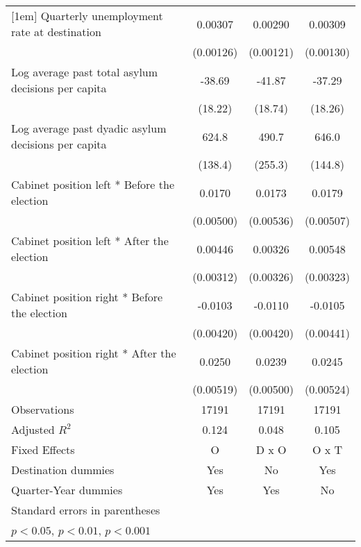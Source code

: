 \begin{table}[htbp]
\begin{tabular}{l*{3}{c}}
[1em]
Quarterly unemployment rate at destination&     0.00307\sym{*}  &     0.00290\sym{*}  &     0.00309\sym{*}  \\
                    &   (0.00126)         &   (0.00121)         &   (0.00130)         \\
[1em]
Log average past total asylum decisions per capita&      -38.69\sym{*}  &      -41.87\sym{*}  &      -37.29\sym{*}  \\
                    &     (18.22)         &     (18.74)         &     (18.26)         \\
[1em]
Log average past dyadic asylum decisions per capita&       624.8\sym{***}&       490.7         &       646.0\sym{***}\\
                    &     (138.4)         &     (255.3)         &     (144.8)         \\
[1em]
Cabinet position left * Before the election&      0.0170\sym{**} &      0.0173\sym{**} &      0.0179\sym{***}\\
                    &   (0.00500)         &   (0.00536)         &   (0.00507)         \\
[1em]
Cabinet position left * After the election&     0.00446         &     0.00326         &     0.00548         \\
                    &   (0.00312)         &   (0.00326)         &   (0.00323)         \\
[1em]
Cabinet position right * Before the election&     -0.0103\sym{*}  &     -0.0110\sym{*}  &     -0.0105\sym{*}  \\
                    &   (0.00420)         &   (0.00420)         &   (0.00441)         \\
[1em]
Cabinet position right * After the election&      0.0250\sym{***}&      0.0239\sym{***}&      0.0245\sym{***}\\
                    &   (0.00519)         &   (0.00500)         &   (0.00524)         \\
\hline
Observations        &       17191         &       17191         &       17191         \\
Adjusted \(R^{2}\)  &       0.124         &       0.048         &       0.105         \\
Fixed Effects       &           O         &       D x O         &       O x T         \\
Destination dummies &         Yes         &          No         &         Yes         \\
Quarter-Year dummies&         Yes         &         Yes         &          No         \\
\hline\hline
\multicolumn{4}{l}{\footnotesize Standard errors in parentheses}\\
\multicolumn{4}{l}{\footnotesize \sym{*} \(p<0.05\), \sym{**} \(p<0.01\), \sym{***} \(p<0.001\)}\\
\end{tabular}
\end{table}

